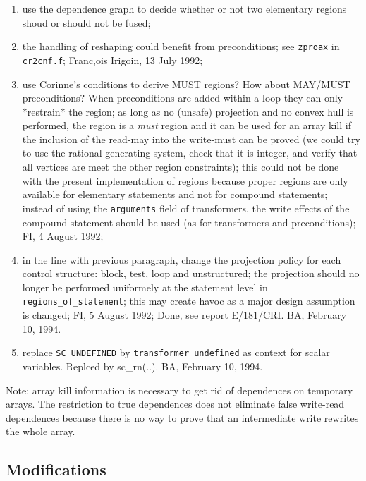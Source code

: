 \begin{enumerate}

  \item use the dependence graph to decide whether or not two elementary
	regions shoud or should not be fused;

  \item the handling of reshaping could benefit from preconditions;
	see \verb+zproax+ in \verb+cr2cnf.f+; Franc,ois Irigoin,
	13 July 1992;

  \item use {Corinne}'s conditions to derive MUST regions? How about MAY/MUST
	preconditions? When preconditions are added within a loop they
	can only *restrain* the region; as long as no (unsafe) projection
	and no convex hull is performed, the region is a {\em must} region
	and it can be used for an array kill if the inclusion of the
	read-may into the write-must can be proved (we could try to use
	the rational generating system, check that it is integer, and
	verify that all vertices are meet the other region constraints);
	this could not be done with the present implementation of regions
	because proper regions are only available for elementary statements
	and not for compound statements; instead of using the \verb+arguments+
	field of transformers, the write effects of the compound statement
	should be used (as for transformers and preconditions);
	FI, 4 August 1992;

  \item in the line with previous paragraph, change the projection
	policy for each control structure: block, test, loop and
	unstructured; the projection should no longer be performed
	uniformely at the statement level in \verb+regions_of_statement+;
	this may create havoc as a major design assumption is changed;
	FI, 5 August 1992; Done, see report E/181/CRI. BA, February 10, 1994.

  \item replace \verb+SC_UNDEFINED+ by \verb+transformer_undefined+
	as context for scalar variables. Replced by sc_rn(..). BA,
	February 10, 1994.

\end{enumerate}

Note: array kill information is necessary to get rid of dependences on
temporary arrays. The restriction to true dependences does not eliminate
false write-read dependences because there is no way to prove that an
intermediate write rewrites the whole array.

\subsection{Modifications}

